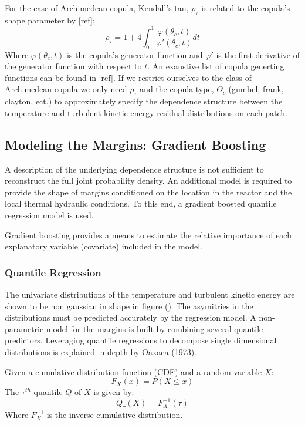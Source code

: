 For the case of Archimedean copula, Kendall's tau, $\rho_\tau$ is
related to the copula's shape parameter by [ref]:
\begin{equation}
\rho_\tau = 1 + 4 \int_0^1 \frac{\varphi(\theta_c,t)}{\varphi'(\theta_c, t)}dt
\end{equation}
Where $\varphi(\theta_c, t)$ is the copula's generator function and $\varphi'$ is the first derivative of the generator function with respect to $t$.  An exaustive list of copula generting functions can be found in [ref].
If we restrict ourselves to the class of Archimedean copula we only need $\rho_\tau$ and the copula type, $\Theta_c$ (gumbel, frank, clayton, ect.) to approximately specify the dependence structure between the temperature and turbulent kinetic energy residual distributions on each patch.

\subsection{Modeling the Margins: Gradient Boosting}

A description of the underlying dependence structure is not sufficient to reconstruct the full joint probability density.  An additional model is required to provide the shape of margins conditioned on the location in the reactor and the local thermal hydraulic conditions.  To this end, a gradient boosted quantile regression model is used.

Gradient boosting provides a means to estimate the relative importance of each explanatory variable (covariate) included in the model.

\subsubsection{Quantile Regression}

The univariate distributions of the temperature and turbulent kinetic energy are shown to be non gaussian in shape in figure ().  The asymitries in the distributions must be predicted accurately by the regression model.  A non-parametric model for the margins is built by combining several quantile predictors.  Leveraging quantile regressions to decompose single dimensional distributions is explained in depth by Oaxaca (1973).

Given a cumulative distribution function (CDF) and a random variable $X$:
\begin{equation}
F_X(x) = P(X \leq x)
\end{equation}
The $\tau^{th}$ quantile $Q$ of $X$ is given by:
\begin{equation}
Q_\tau(X) = F_X^{-1}(\tau)
\end{equation}
Where $F_X^{-1}$ is the inverse cumulative distribution.

